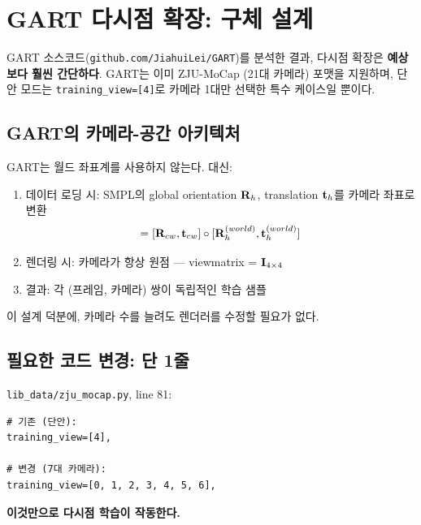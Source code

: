 \documentclass[11pt, a4paper]{report}
\begin{document}
\chapter{GART 다시점 확장: 구체 설계}

GART 소스코드(\texttt{github.com/JiahuiLei/GART})를 분석한 결과, 다시점 확장은 \textbf{예상보다 훨씬 간단하다}. GART는 이미 ZJU-MoCap (21대 카메라) 포맷을 지원하며, 단안 모드는 \texttt{training\_view=[4]}로 카메라 1대만 선택한 특수 케이스일 뿐이다.

\section{GART의 카메라-공간 아키텍처}

\begin{keyidea}[title={핵심 설계: 모든 것이 카메라 좌표계에서 동작}]
GART는 월드 좌표계를 사용하지 않는다. 대신:
\begin{enumerate}[leftmargin=*]
  \item 데이터 로딩 시: SMPL의 global orientation $\mathbf{R}_h$, translation $\mathbf{t}_h$를 카메라 좌표로 변환
  \begin{equation}
  [\mR_h^{(cam)}, \vt_h^{(cam)}] = [\mR_{cw}, \vt_{cw}] \circ [\mR_h^{(world)}, \vt_h^{(world)}]
  \end{equation}
  \item 렌더링 시: 카메라가 항상 원점 --- viewmatrix = $\mathbf{I}_{4 \times 4}$
  \item 결과: 각 (프레임, 카메라) 쌍이 독립적인 학습 샘플
\end{enumerate}
이 설계 덕분에, 카메라 수를 늘려도 렌더러를 수정할 필요가 없다.
\end{keyidea}


\section{필요한 코드 변경: 단 1줄}

\begin{setupbox}[title={최소 변경}]
\texttt{lib\_data/zju\_mocap.py}, line 81:
\begin{verbatim}
# 기존 (단안):
training_view=[4],

# 변경 (7대 카메라):
training_view=[0, 1, 2, 3, 4, 5, 6],
\end{verbatim}
\textbf{이것만으로 다시점 학습이 작동한다.}
\end{setupbox}
\end{document}
